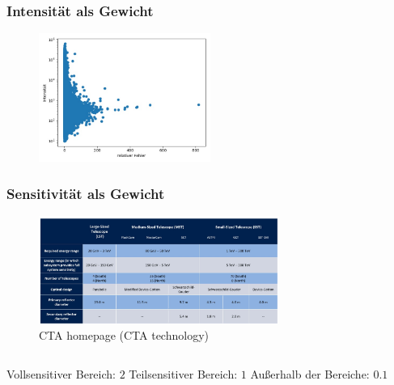 \documentclass[aspectratio=1610, professionalfonts, 9pt]{beamer}
\begin{document}
  \begin{frame}
    \frametitle{Intensität als Gewicht}
    \begin{figure}
      \includegraphics[width=0.5\textwidth]{pictures/intensity.jpg}
      \caption{}
      \label{}
    \end{figure}
  \end{frame}

  \begin{frame}
    \frametitle{Sensitivität als Gewicht}
    \begin{figure}
      \includegraphics[width=0.7\textwidth]{pictures/Spec.JPG}
      \caption{CTA homepage (CTA technology)}
      \label{}
    \end{figure}
    \begin{columns}
      Vollsensitiver Bereich: $\num{2}$
      Teilsensitiver Bereich: $\num{1}$
       Außerhalb der Bereiche: $\num{0.1}$
    \end{columns}
  \end{frame}
\end{document}
